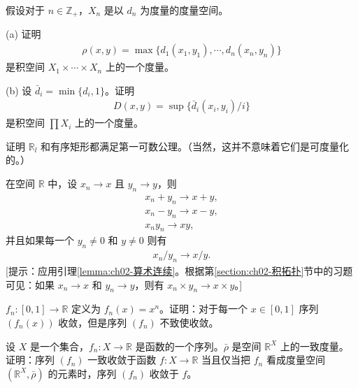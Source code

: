 \documentclass[../../main.tex]{subfiles}
\begin{document}
\begin{exercise}\label{exercise:ch02-度量拓扑续-3}
假设对于 $n \in \mathbb{Z}_{+}$，$X_{n}$ 是以 $d_{n}$ 为度量的度量空间。

(a) 证明
\begin{align*}
\rho(x, y) = \max \{d_{1}(x_{1}, y_{1}), \cdots, d_{n}(x_{n}, y_{n})\}
\end{align*}
是积空间 $X_{1} \times \cdots \times X_{n}$ 上的一个度量。

(b) 设 $\bar{d}_{i} = \min \{d_{i}, 1\}$。证明
\begin{align*}
D(x, y) = \sup \{\bar{d}_{i}(x_{i}, y_{i})/i\}
\end{align*}
是积空间 $\prod X_{i}$ 上的一个度量。
\end{exercise}

\begin{exercise}\label{exercise:ch02-度量拓扑续-4}
证明 $\mathbb{R}_{l}$ 和有序矩形都满足第一可数公理。（当然，这并不意味着它们是可度量化的。）
\end{exercise}

\begin{exercise}\label{exercise:ch02-度量拓扑续-5}
在空间 $\mathbb{R}$ 中，设 $x_{n} \rightarrow x$ 且 $y_{n} \rightarrow y$，则
\begin{align*}
x_{n} + y_{n} \rightarrow x + y, \\
x_{n} - y_{n} \rightarrow x - y, \\
x_{n} y_{n} \rightarrow xy,
\end{align*}
并且如果每一个 $y_{n} \neq 0$ 和 $y \neq 0$ 则有
\begin{align*}
x_{n}/y_{n} \rightarrow x/y.
\end{align*}
[提示：应用引理\cref{lemma:ch02-算术连续}。根据第\cref{section:ch02-积拓扑}节中的习题可见：如果 $x_{n} \rightarrow x$ 和 $y_{n} \rightarrow y$，则有 $x_{n} \times y_{n} \rightarrow x \times y$。]
\end{exercise}

\begin{exercise}\label{exercise:ch02-度量拓扑续-6}
$f_{n}: [0, 1] \rightarrow \mathbb{R}$ 定义为 $f_{n}(x) = x^{n}$。证明：对于每一个 $x \in [0, 1]$ 序列 $(f_{n}(x))$ 收敛，但是序列 $(f_{n})$ 不致使收敛。
\end{exercise}

\begin{exercise}\label{exercise:ch02-度量拓扑续-7}
设 $X$ 是一个集合，$f_{n}: X \rightarrow \mathbb{R}$ 是函数的一个序列。$\bar{\rho}$ 是空间 $\mathbb{R}^{X}$ 上的一致度量。证明：序列 $(f_{n})$ 一致收敛于函数 $f: X \rightarrow \mathbb{R}$ 当且仅当把 $f_{n}$ 看成度量空间 $(\mathbb{R}^{X}, \bar{\rho})$ 的元素时，序列 $(f_{n})$ 收敛于 $f$。
\end{exercise}
\end{document}
